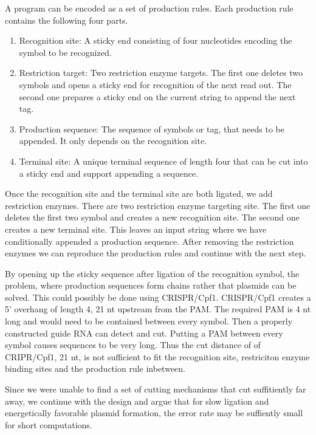 \documentclass[
11pt, %
a4paper, %
oneside, %
headinclude,footinclude, %
BCOR5mm, %
]{scrartcl}
\begin{document}
A program can be encoded as a set of production rules. Each production rule
contains the following four parts.

\begin{enumerate}
  \item Recognition site: A sticky end consisting of four nucleotides encoding
    the symbol to be recognized.
  \item Restriction target: Two restriction enzyme targets. The first one
    deletes two symbols and opens a sticky end for recognition of the next
    read out. The second one prepares a sticky end on the current string to
    append the next tag.
  \item Production sequence: The sequence of symbols or tag, that needs to be
    appended. It only depends on the recognition site.
  \item Terminal site: A unique terminal sequence of length four that can be cut
    into a sticky end and support appending a sequence.
\end{enumerate}

Once the recognition site and the terminal site are both ligated, we add
restriction enzymes. There are two restriction enzyme targeting site. The first
one deletes the first two symbol and creates a new recognition site. The second
one creates a new terminal site. This leaves an input string where we have
conditionally appended a production sequence. After removing the restriction
enzymes we can reproduce the production rules and continue with the next step.

By opening up the sticky sequence after ligation of the recognition symbol, the
problem, where production sequences form chains rather that plasmids can be
solved. This could possibly be done using CRISPR/Cpf1. CRISPR/Cpf1 creates a 5'
overhang of length 4, 21 nt upstream from the PAM. The required PAM is 4 nt
long and would need to be contained between every symbol. Then a properly
constructed guide RNA can detect and cut. Putting a PAM between every symbol
causes sequences to be very long. Thus the cut distance of of CRIPR/Cpf1, 21
nt, is not sufficient to fit the recognition site, restriciton enzyme binding
sites and the production rule inbetween.

Since we were unable to find a set of cutting mechanisms that cut suffitiently
far away, we continue with the design and argue that for slow ligation and
energetically favorable plasmid formation, the error rate may be suffiently
small for short computations. 
\end{document}
